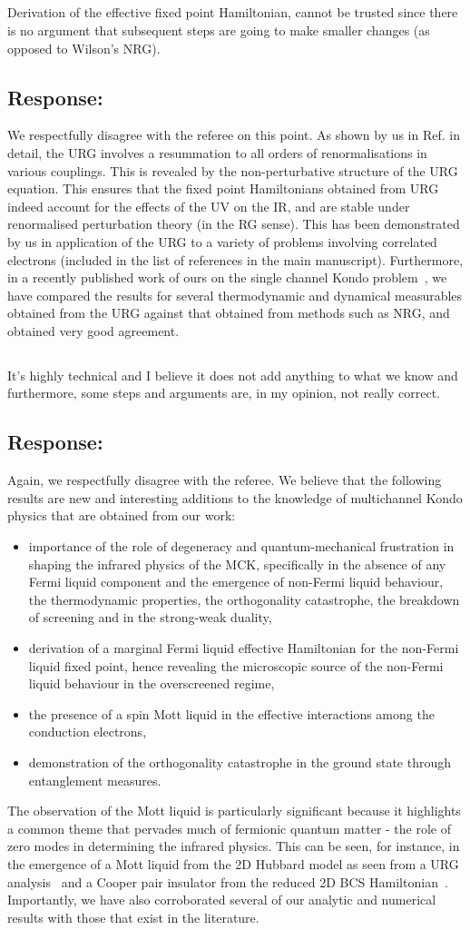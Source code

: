 \documentclass{article}
\newcommand{\response}[1]{{\color{blue}\subsection*{Response:}{#1}}}
\newcommand{\point}[1]{\subsection{}{#1}}
\begin{document}
\point{
Derivation of the effective fixed
point Hamiltonian, cannot be trusted since there is no argument that
subsequent steps are going to make smaller changes (as opposed to
Wilson’s NRG).
}

\response{
We respectfully disagree with the referee on this point. As shown by us in Ref.\cite{anirbanurg1} in detail, the URG involves a resummation to all orders of renormalisations in various couplings. This is revealed by the non-perturbative structure of the URG equation. This ensures that the fixed point Hamiltonians obtained from URG indeed account for the effects of the UV on the IR, and are stable under renormalised perturbation theory (in the RG sense). This has been demonstrated by us in application of the URG to a variety of problems involving correlated electrons (included in the list of references in the main manuscript). Furthermore, in a recently published work of ours on the single channel Kondo problem~\cite{kondo_urg}, we have compared the results for several thermodynamic and dynamical measurables obtained from the URG against that obtained from methods such as NRG, and obtained very good agreement. 
}

\point{
It’s highly
technical and I believe it does not add anything to what we know and
furthermore, some steps and arguments are, in my opinion, not really
correct.
}

\response{
Again, we respectfully disagree with the referee. We believe that the following results are new and interesting additions to the knowledge of multichannel Kondo physics that are obtained from our work:
\begin{itemize}
	\item importance of the role of degeneracy and quantum-mechanical frustration in shaping the infrared physics of the MCK, specifically in the absence of any Fermi liquid component and the emergence of non-Fermi liquid behaviour, the thermodynamic properties, the orthogonality catastrophe, the breakdown of screening and in the strong-weak duality,
	\item derivation of a marginal Fermi liquid effective Hamiltonian for the non-Fermi liquid fixed point, hence revealing the microscopic source of the non-Fermi liquid behaviour in the overscreened regime,
	\item the presence of a spin Mott liquid in the effective interactions among the conduction electrons,
	\item demonstration of the orthogonality catastrophe in the ground state through entanglement measures.
\end{itemize}
The observation of the Mott liquid is particularly significant because it highlights a common theme that pervades much of fermionic quantum matter - the role of zero modes in determining the infrared physics. This can be seen, for instance, in the emergence of a Mott liquid from the 2D Hubbard model as seen from a URG analysis~\cite{anirbanmott1,anirbanmott2,mukherjeeMERG2022} and a Cooper pair insulator from the reduced 2D BCS Hamiltonian~\cite{siddharthacpi}. Importantly, we have also corroborated several of our analytic and numerical results with those that exist in the literature.
}
\end{document}
